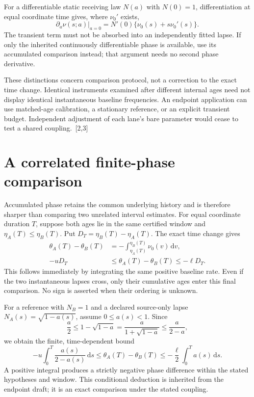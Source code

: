 \documentclass[10pt,twocolumn,letterpaper]{article}
\newcommand{\dd}{\mathrm{d}}
\begin{document}
For a differentiable static receiving law $N(a)$ with $N(0)=1$, differentiation at equal coordinate time gives, where $\nu_0'$ exists,
\[
 \left.\partial_a\nu(s;a)\right|_{a=0}
 =N'(0)\{\nu_0(s)+s\nu_0'(s)\}.
\]
The transient term must not be absorbed into an independently fitted lapse. If only the inherited continuously differentiable phase is available, use its accumulated comparison instead; that argument needs no second phase derivative.

These distinctions concern comparison protocol, not a correction to the exact time change. Identical instruments examined after different internal ages need not display identical instantaneous baseline frequencies. An endpoint application can use matched-age calibration, a stationary reference, or an explicit transient budget. Independent adjustment of each lane's bare parameter would cease to test a shared coupling.~[2,3]


\section{A correlated finite-phase comparison}
Accumulated phase retains the common underlying history and is therefore sharper than comparing two unrelated interval estimates. For equal coordinate duration $T$, suppose both ages lie in the same certified window and $\eta_A(T)\le\eta_B(T)$. Put $D_T=\eta_B(T)-\eta_A(T)$. The exact time change gives
\[
\begin{aligned}
 \theta_A(T)-\theta_B(T)
 &=-\int_{\eta_A(T)}^{\eta_B(T)}\nu_0(v)\,\dd v,\\
 -uD_T&\le\theta_A(T)-\theta_B(T)\le-\ell D_T.
\end{aligned}
\]
This follows immediately by integrating the same positive baseline rate. Even if the two instantaneous lapses cross, only their cumulative ages enter this final comparison. No sign is asserted when their ordering is unknown.

For a reference with $N_B=1$ and a declared source-only lapse $N_A(s)=\sqrt{1-a(s)}$, assume $0\le a(s)<1$. Since
\[
 \frac a 2\le 1-\sqrt{1-a}=\frac{a}{1+\sqrt{1-a}}
 \le\frac{a}{2-a},
\]
we obtain the finite, time-dependent bound
\[
 -u\int_0^T\frac{a(s)}{2-a(s)}\,\dd s
 \le\theta_A(T)-\theta_B(T)
 \le-\frac\ell 2\int_0^Ta(s)\,\dd s.
\]
A positive integral produces a strictly negative phase difference within the stated hypotheses and window. This conditional deduction is inherited from the endpoint draft; it is an exact comparison under the stated coupling.
\end{document}

